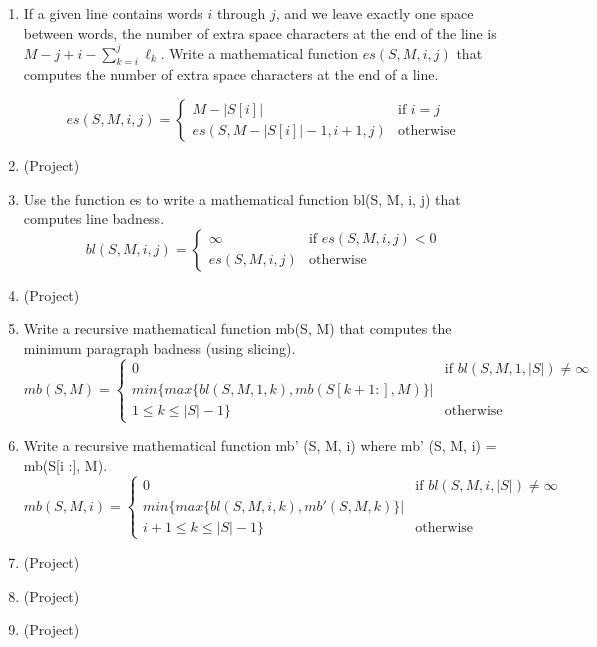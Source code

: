 \documentclass[12pt]{article}%
\begin{document}
\begin{enumerate}[label=(\alph*)]
    \item If a given line contains words $i$ through $j$, and we leave
  exactly one space between words, the number of extra space
  characters at the end of the line is $M - j + i - \sum_{k=i}^{j}
  \ell_k$.  Write a mathematical function $es(S, M, i, j)$ that
  computes the number of extra space characters at the end of a line.
  
$$  
es(S,M, i,j) = 
  \begin{cases}
   M- |S[i]| & \text{if } i=j \\
    es(S, M-|S[i]| -1, i + 1, j)      & \text{otherwise}
  \end{cases}
$$

    
    \item (Project)\\
    
    \item Use the function es to write a mathematical function bl(S, M, i, j) that computes line badness.\\

$$
bl(S,M, i,j) = 
  \begin{cases}
   \infty & \text{if } es(S,M,i,j) < 0 \\
    es(S,M,i,j)     & \text{otherwise}
  \end{cases}
$$
    
    \item (Project)\\
    
    \item  Write a recursive mathematical function mb(S, M) that computes the minimum paragraph badness (using
slicing).\\

$$
mb(S,M) = 
  \begin{cases}
   0 & \text{if } bl(S, M, 1, |S|)  \neq  \infty \\
   min\{max\{bl(S, M, 1, k), mb(S[k+1:], M)\} |\\
    1 \leq k \leq |S| -1\}    & \text{otherwise}
  \end{cases}
$$

\item Write a recursive mathematical function mb'
(S, M, i) where mb'
(S, M, i) = mb(S[i :], M).\\


$$
mb(S, M, i) = 
  \begin{cases}
   0 & \text{if } bl(S, M, i, |S|)  \neq  \infty \\
   min\{max\{bl(S, M, i, k), mb'(S, M, k)\} |\\
    i + 1 \leq k \leq |S| -1\}    & \text{otherwise}
  \end{cases}
$$

\item (Project) \\
\item (Project) \\
\item (Project) \\

    
\end{enumerate}
\end{document}
